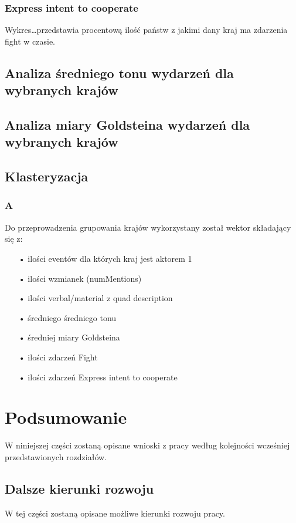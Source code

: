 \documentclass[11pt]{report}
\begin{document}
    \subsection{Express intent to cooperate}

    Wykres\ldots przedstawia procentową ilość państw z jakimi dany kraj ma zdarzenia fight w czasie.


    \section{Analiza średniego tonu wydarzeń dla wybranych krajów}


    \section{Analiza miary Goldsteina wydarzeń dla wybranych krajów}


    \section{Klasteryzacja}

    \subsection{A}
    Do przeprowadzenia grupowania krajów wykorzystany został wektor składający się z:
    \begin{enumerate}
        \item[•] ilości eventów dla których kraj jest aktorem 1
        \item[•] ilości wzmianek (numMentions)
        \item[•] ilości verbal/material z quad description
        \item[•] średniego średniego tonu
        \item[•] średniej miary Goldsteina
        \item[•] ilości zdarzeń Fight
        \item[•] ilości zdarzeń Express intent to cooperate
    \end{enumerate}


    \chapter{Podsumowanie}
    W niniejszej części zostaną opisane wnioski z pracy według kolejności wcześniej przedstawionych rozdziałów.


    \section{Dalsze kierunki rozwoju}
    W tej części zostaną opisane możliwe kierunki rozwoju pracy.
\end{document}
